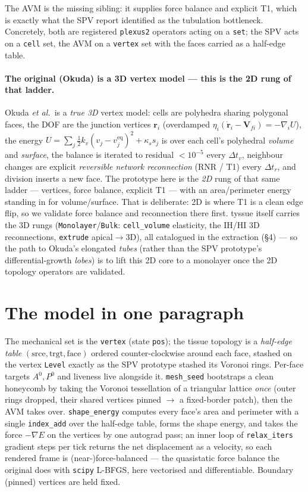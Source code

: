 \documentclass[11pt]{article}
\begin{document}
The AVM is the missing sibling: it supplies force balance and explicit T1, which is exactly
what the SPV report identified as the tubulation bottleneck. Concretely, both are registered
\texttt{plexus2} operators acting on a \texttt{set}; the SPV acts on a \texttt{cell} set, the
AVM on a \texttt{vertex} set with the faces carried as a half-edge table.

\paragraph{The original (Okuda) is a 3D vertex model --- this is the 2D rung of that ladder.}
Okuda \emph{et al.}\ is a \emph{true 3D} vertex model: cells are polyhedra sharing polygonal
faces, the DOF are the junction vertices $\mathbf r_i$ (overdamped
$\eta_i(\dot{\mathbf r}_i-\mathbf V_{fi})=-\nabla_i U$), the energy
$U=\sum_j \tfrac12 k_v(v_j-v_j^{\mathrm{eq}})^2+\kappa_s s_j$ is over each cell's polyhedral
\emph{volume} and \emph{surface}, the balance is iterated to residual $<10^{-5}$ every
$\Delta t_v$, neighbour changes are explicit \emph{reversible network reconnection} (RNR / T1)
every $\Delta t_r$, and division inserts a new face. The prototype here is the \emph{2D} rung of
that same ladder --- vertices, force balance, explicit T1 --- with an area/perimeter energy
standing in for volume/surface. That is deliberate: 2D is where T1 is a clean edge flip, so we
validate force balance and reconnection there first. tyssue itself carries the 3D rungs
(\texttt{Monolayer}/\texttt{Bulk}: \texttt{cell\_volume} elasticity, the IH/HI 3D reconnections,
\texttt{extrude} apical$\to$3D), all catalogued in the extraction (\S4) --- so the path to Okuda's
elongated \emph{tubes} (rather than the SPV prototype's differential-growth \emph{lobes}) is to
lift this 2D core to a monolayer once the 2D topology operators are validated.

\section{The model in one paragraph}
The mechanical set is the \texttt{vertex} (state \texttt{pos}); the tissue topology is a
\emph{half-edge table} $(\mathrm{srce},\mathrm{trgt},\mathrm{face})$ ordered counter-clockwise
around each face, stashed on the vertex \texttt{Level} exactly as the SPV prototype stashed its
Voronoi rings. Per-face targets $A^0,P^0$ and liveness live alongside it. \texttt{mesh\_seed}
bootstraps a clean honeycomb by taking the Voronoi tessellation of a triangular lattice
\emph{once} (outer rings dropped, their shared vertices pinned $\to$ a fixed-border patch), then
the AVM takes over. \texttt{shape\_energy} computes every face's area and perimeter with a
single \texttt{index\_add} over the half-edge table, forms the shape energy, and takes the force
$-\nabla E$ on the vertices by one autograd pass; an inner loop of \texttt{relax\_iters} gradient
steps per tick returns the net displacement as a velocity, so each rendered frame is
(near-)force-balanced --- the quasistatic force balance the original does with \texttt{scipy}
L-BFGS, here vectorised and differentiable. Boundary (pinned) vertices are held fixed.
\end{document}
